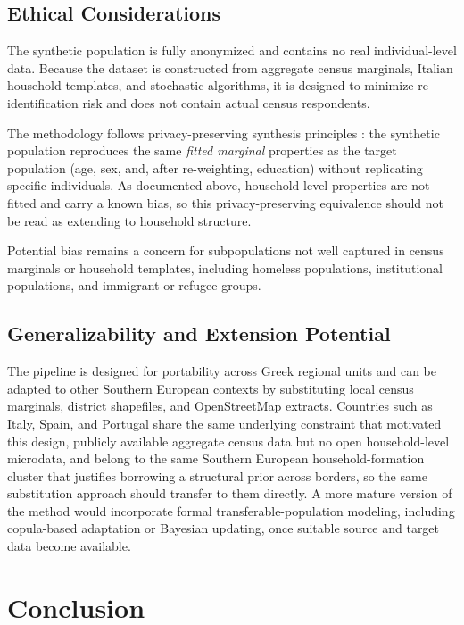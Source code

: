 \documentclass{article}
\begin{document}
\subsection{Ethical Considerations}\label{ethical-considerations}

The synthetic population is fully anonymized and contains no real individual-level data. Because the dataset is constructed from aggregate census marginals, Italian household templates, and stochastic algorithms, it is designed to minimize re-identification risk and does not contain actual census respondents.

The methodology follows privacy-preserving synthesis principles \citep{SanchezSerrano2025DP}: the synthetic population reproduces the same \textit{fitted marginal} properties as the target population (age, sex, and, after re-weighting, education) without replicating specific individuals. As documented above, household-level properties are not fitted and carry a known bias, so this privacy-preserving equivalence should not be read as extending to household structure.

Potential bias remains a concern for subpopulations not well captured in census marginals or household templates, including homeless populations, institutional populations, and immigrant or refugee groups.

\subsection{Generalizability and Extension Potential}\label{generalizability-and-extension-potential}

The pipeline is designed for portability across Greek regional units and can be adapted to other Southern European contexts by substituting local census marginals, district shapefiles, and OpenStreetMap extracts. Countries such as Italy, Spain, and Portugal share the same underlying constraint that motivated this design, publicly available aggregate census data but no open household-level microdata, and belong to the same Southern European household-formation cluster that justifies borrowing a structural prior across borders, so the same substitution approach should transfer to them directly. A more mature version of the method would incorporate formal transferable-population modeling, including copula-based adaptation or Bayesian updating, once suitable source and target data become available.

\section{Conclusion}\label{conclusion}
\end{document}
